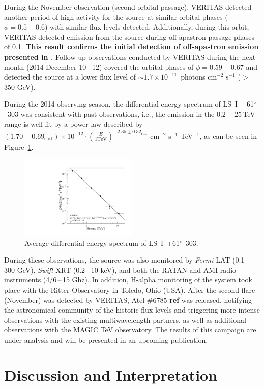 \documentclass[preprint2]{aastex}
\newcommand{\pflux}{~photons cm$^{-2}$ s$^{-1}$}
\newcommand{\lsi}{LS~I~+61$^{\circ}$~303}
\newcommand{\tev}{\,TeV}
\begin{document}
During the November observation (second orbital passage), VERITAS detected another period of high activity for the source at similar orbital phases ($\phi = 0.5-0.6$) with similar flux levels detected. Additionally, during this orbit, VERITAS detected emission from the source during off-apastron passage phases of 0.1. \textbf{This result confirms the initial detection of off-apastron emission presented in \citep{2011ApJ...738....3A}.} Follow-up observations conducted by VERITAS during the next month (2014 December 10\,--\,12) covered the orbital phases of $\phi=0.59-0.67$ and detected the source at a lower flux level of $\sim1.7\times10^{-11}$\pflux{} ($>$350 GeV).

During the 2014 observing season, the differential energy spectrum of \lsi{} was consistent with past observations, i.e., the emission in the $0.2-25$\tev{} range is well fit by a power-law described by $\left( 1.70 \pm 0.69_{\mathrm{stat}} \right) \times 10^{-12} \cdot \left( \frac{E}{\mathrm{1 TeV}} \right)^{-2.35 \pm 0.32_{\mathrm{stat}}}$ cm$^{-2}$ s$^{-1}$ TeV$^{-1}$, as can be seen in Figure~\ref{spec}.

\begin{figure}
\centering
\includegraphics[width=0.5\textwidth]{figs/vegasspec.pdf}
\caption{Average differential energy spectrum of \lsi{}.}
\label{spec}
\end{figure}

During these observations, the source was also monitored by \emph{Fermi}-LAT (0.1\,--\,300 GeV), \emph{Swift}-XRT (0.2\,--\,10 keV), and both the RATAN and AMI radio instruments (4/6\,--\,15 Ghz). In addition, H-alpha monitoring of the system took place with the Ritter Observatory in Toledo, Ohio (USA). After the second flare (November) was detected by VERITAS, Atel $\#$6785 \textbf{ref} was released, notifying the astronomical community of the historic flux levels and triggering more intense observations with the existing multiwavelength partners, as well as additional observations with the MAGIC TeV observatory. The results of this campaign are under analysis and will be presented in an upcoming publication. 

\section{Discussion and Interpretation}





\end{document}
